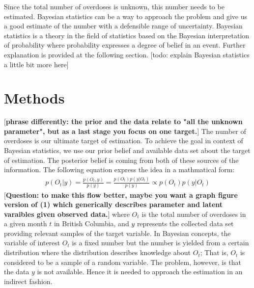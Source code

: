 \documentclass[12pt]{article}
\begin{document}
Since the total number of overdoses is unknown, this number needs to be estimated. Bayesian statistics can be a way to approach the problem and give us a good estimate of the number with a defensible range of uncertainty. Bayesian statistics is a theory in the field of statistics based on the Bayesian interpretation of probability where probability expresses a degree of belief in an event. \cite{wiki_bayes} Further explanation is provided at the following section. [todo: explain Bayesian statistics a little bit more here]\\


\section{Methods}

\normalsize
[\textbf{phrase differently: the prior and the data relate to "all the unknown parameter", but as a last stage you focus on one target.}]
The number of overdoses is our ultimate target of estimation. To achieve the goal in context of Bayesian statistics, we use our prior belief and available data set about the target of estimation. The posterior belief is coming from both of these sources of the information. The following equation express the idea in a mathmatical form:
\begin{equation}
\label{bayes_thm}
\left.\begin{aligned}
p(O_t| y ) = \frac{ p(O_t, y)   }{ p(y)} = \frac{ p(O_t) p(y| O_t)}{ p(y)} \propto p(O_t) p(y| O_t) \end{aligned}\right.
\end{equation}
[\textbf{Question: to make this flow better, maybe you want a graph figure version of (1) which generically describes parameter and latent varaibles given observed data.}]
where $O_t$ is the total number of overdoses in a given month $t$ in British Columbia, and $y$ represents the collected data set providing relevant samples of the target variable. In Bayesian concepts, the variable of interest $O_t$ is a fixed number but the number is yielded from a certain distribution where the distribution describes knowledge about $O_t$; That is, $O_t$ is considered to be a sample of a random variable. The problem, however, is that the data $y$ is not available. Hence it is needed to approach the estimation in an indirect fashion. \\ 
\end{document}
